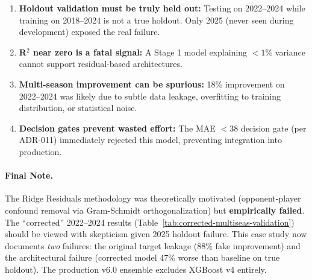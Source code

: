 \begin{enumerate}[itemsep=2pt,parsep=0pt]
    \item \textbf{Holdout validation must be truly held out:} Testing on 2022--2024 while training on 2018--2024 is not a true holdout. Only 2025 (never seen during development) exposed the real failure.

    \item \textbf{R$^2$ near zero is a fatal signal:} A Stage 1 model explaining $< 1\%$ variance cannot support residual-based architectures.

    \item \textbf{Multi-season improvement can be spurious:} 18\% improvement on 2022--2024 was likely due to subtle data leakage, overfitting to training distribution, or statistical noise.

    \item \textbf{Decision gates prevent wasted effort:} The MAE $< 38$ decision gate (per ADR-011) immediately rejected this model, preventing integration into production.
\end{enumerate}

\paragraph{Final Note.}
The Ridge Residuals methodology was theoretically motivated (opponent-player confound removal via Gram-Schmidt orthogonalization) but \textbf{empirically failed}. The ``corrected'' 2022--2024 results (Table~\ref{tab:corrected-multiseas-validation}) should be viewed with skepticism given 2025 holdout failure. This case study now documents \textit{two} failures: the original target leakage (88\% fake improvement) and the architectural failure (corrected model 47\% worse than baseline on true holdout). The production v6.0 ensemble excludes XGBoost v4 entirely.
